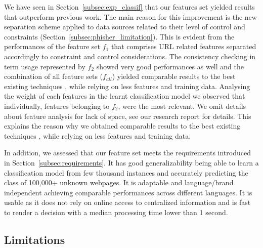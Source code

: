 \documentclass[10pt,conference,compsocconf,letterpaper]{IEEEtran}
\begin{document}
We have seen in Section~\ref{subsec:exp_classif} that our features set yielded results that outperform previous work. The main reason for this improvement is the new separation scheme applied to data sources related to their level of control and constraints (Section~\ref{subsec:phisher_limitation}). 
\iffeateval
This is evident from the performances of the feature set $f_1$ that comprises URL related features separated accordingly to constraint and control considerations.
The consistency checking in term usage represented by $f_2$ showed very good performances as well and the combination of all feature sets ($f_{all}$) yielded comparable results to the best existing techniques \cite{whittaker:2010:large}, while relying on less features and training data.
\else
Analysing the weight of each features in the learnt classification model we observed that individually, features belonging to $f_2$, were the most relevant. We omit details about feature analysis for lack of space, see our research report \cite{arXiv} for details. This explains the reason why we obtained comparable results to the best existing techniques \cite{whittaker:2010:large}, while relying on less features and training data.
\fi

In addition, we assessed that our feature set meets the requirements introduced in Section~\ref{subsec:requirements}. It has good generalizability being able to learn a classification model from few thousand instances and accurately predicting the class of 100,000+ unknown webpages. It is adaptable and language/brand independent achieving comparable performances across different languages. It is usable as it does not rely on online access to centralized information and is fast to render a decision with a median processing time lower than 1 second.
 
\subsection{Limitations}
\end{document}
